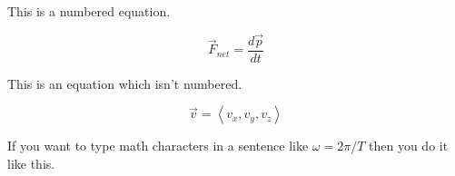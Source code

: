\documentclass[10pt]{article}
\begin{document}
This is a numbered equation.

\begin{equation}
	\vec{F}_{net}=\frac{d\vec{p}}{dt}
\end{equation}

This is an equation which isn't numbered.

\begin{displaymath}
	\vec{v}=\left< v_x, v_y, v_z \right>
\end{displaymath}

If you want to type math characters in a sentence like $\omega = 2\pi / T$ then you do it like this.
\end{document}
